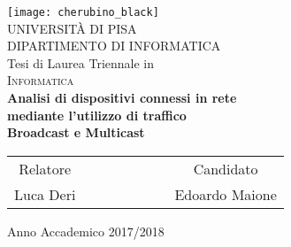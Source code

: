 



\begin{titlepage}
 \begin{center}
     \texttt{[image: cherubino\_black]}\\
     \vspace{1em}
     {\Large \textsc{UNIVERSIT\`A DI PISA}}\\
     \vspace{1em}
     {\Large \textsc{DIPARTIMENTO DI INFORMATICA}}\\
     \vspace{2em}
     {\normalsize Tesi di Laurea Triennale in}\\
     \vspace{1em}
     {\Large \textsc{Informatica}}\\
     \vspace{5em}
     {\LARGE \textbf{Analisi di dispositivi connessi in rete}}\\
     \vspace{1em}
     {\LARGE \textbf{mediante l'utilizzo di traffico}}\\
     \vspace{1em}
     {\LARGE \textbf{Broadcast e Multicast}}\\
 \end{center}

\vskip 2.5cm
  \begin{center}
    \begin{tabular}{c c c c c c c c}
      Relatore & & & & & & & Candidato \\[0.2cm]
      \large{Luca Deri} & & & & & & & \large{Edoardo Maione}\\[0.4cm]
    \end{tabular}
  \end{center}

\vskip 2cm
\begin{center}
{\normalsize Anno Accademico 2017/2018}
\end{center}
\end{titlepage}

